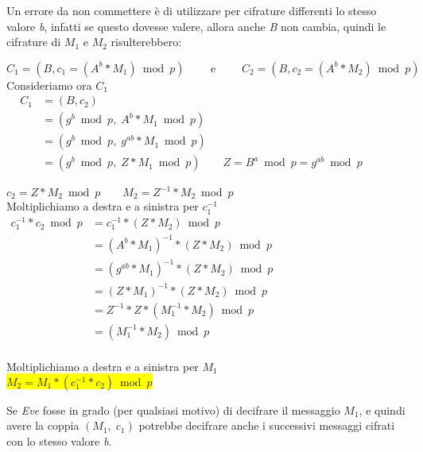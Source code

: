 Un errore da non commettere è di utilizzare per cifrature differenti lo stesso valore \textit{b}, infatti se questo dovesse valere, allora anche \textit{B} non cambia, quindi le cifrature di $M_1 \text{ e } M_2$ risulterebbero:
\begin{center}
    $C_1 = (B, c_1 = (A^b * M_1) \bmod p) \qquad \text{ e } \qquad C_2 = (B, c_2 = (A^b * M_2) \bmod p)$ \\
    Consideriamo ora $C_1$ \\\   \newline
    \begin{math}
        \begin{aligned}
            C_1 &= (B, c_2) \\
            &= (g^b \bmod p,\;A^b * M_1 \bmod p) \\
            &= (g^b \bmod p,\;g^{ab} * M_1 \bmod p) \\
            &= (g^b \bmod p,\;Z * M_1 \bmod p) \qquad Z = B^a \bmod p = g^{ab} \bmod p
        \end{aligned}
    \end{math}    
\end{center}
\begin{center}
    $c_2 = Z * M_2 \bmod p \qquad M_2 = Z^{-1} * M_2 \bmod p$ \\
    Moltiplichiamo a destra e a sinistra per $c_1^{-1}$ \\
    \begin{math}
        \begin{aligned}
            c_1^{-1} * c_2 \bmod p &= c_1^{-1} * (Z * M_2) \bmod p \\ 
            &= (A^b * M_1)^{-1} * (Z * M_2) \bmod p \\
            &= (g^{ab} * M_1)^{-1} * (Z * M_2) \bmod p \\
            &= (Z * M_1)^{-1} * (Z * M_2) \bmod p \\
            &= Z^{-1} * Z * (M_1^{-1} * M_2) \bmod p \\
            &= (M_1^{-1} * M_2) \bmod p \\
        \end{aligned}
    \end{math}
\end{center}
\begin{center}
    Moltiplichiamo a destra e a sinistra per $M_1$ \\
    \colorbox{yellow}{$M_2 = M_1 * (c_1^{-1} * c_2) \bmod p$}
\end{center}
Se \textit{Eve} fosse in grado (per qualsiasi motivo) di decifrare il messaggio $M_1$, e quindi avere la coppia $(M_1, \; c_1)$ potrebbe decifrare anche i successivi messaggi cifrati con lo stesso valore \textit{b}.

